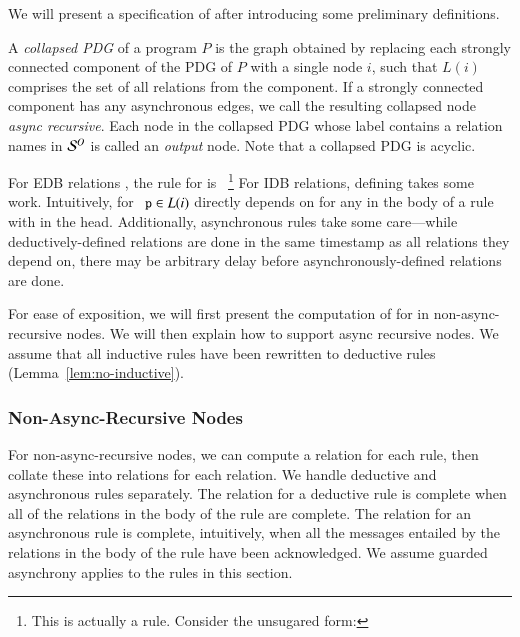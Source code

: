 We will present a specification of  after introducing some preliminary definitions.

A {\em collapsed PDG} of a \lang program $P$ is the graph obtained by replacing each strongly
connected component of the PDG of $P$ with a single node $i$, such that $L(i)$
comprises
the set of all relations from the component.  If a strongly connected
component has any asynchronous edges, we call the resulting collapsed node {\em
  async recursive}.  Each node in the collapsed PDG whose label contains a
relation names in $\oschema$ is called an {\em output} node.  Note that a
collapsed PDG is acyclic.

For EDB relations , the rule for  is ~\footnote{This is actually a rule.  Consider the unsugared form: }  For
IDB relations, defining  takes some work.  Intuitively,  for $\dedalus{p} \in L(i)$ directly depends on  for any  in the body of a rule with  in the head.  Additionally, asynchronous rules take some care---while deductively-defined relations are done in the same timestamp as all relations they depend on, there may be arbitrary delay before asynchronously-defined relations are done.

For ease of exposition, we will first present the computation of  for  in non-async-recursive nodes.  We will then explain how to support async recursive nodes.  We assume that all inductive rules have been rewritten to deductive rules (Lemma~\ref{lem:no-inductive}).

\subsubsection{Non-Async-Recursive Nodes}
\label{sec:nonasyncrecursive}

For non-async-recursive nodes, we can compute a  relation for each
rule, then collate these into  relations for each relation.  We
handle deductive and asynchronous rules separately. The  relation
for a deductive rule is complete when all of the relations in the body of the
rule are complete. The  relation for an asynchronous rule is
complete, intuitively, when all the messages entailed by the relations in the
body of the rule have been acknowledged. We assume guarded asynchrony applies to
the rules in this section.

